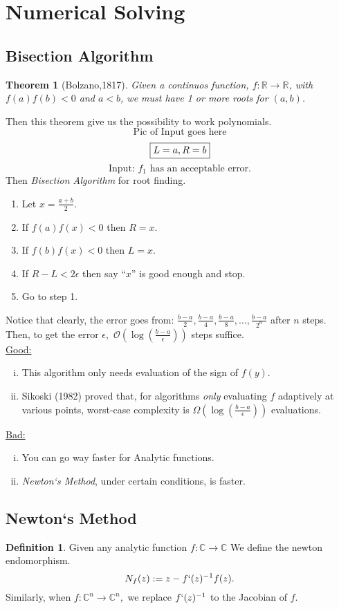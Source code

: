 \documentclass[]{article}
\newtheorem*{theorem}{Theorem}
\theoremstyle{definition}
\newtheorem*{defn}{Definition}
\newcommand{\lecture}[1]{\marginpar{{\footnotesize $\leftarrow$ \underline{#1}}}}
\begin{document}
			\section{Numerical Solving} \lecture{June 28, 2017}
			\subsection{Bisection Algorithm}
			\begin{theorem}[Bolzano,1817] Given a continuos function, $f:\mathbb{R}\to\mathbb{R}$, with $f(a)f(b)<0$ and $a<b$, we must have 1 or more roots for $(a,b)$.
			\end{theorem}
			Then this theorem give us the possibility to work polynomials.
						\[ \text{Pic of Input goes here} \]
						\[\framebox{$L=a, R=b$}\]
			\[\text{Input: $f_1$ has an acceptable error.}\]
			Then \emph{Bisection Algorithm} for root finding.
			\begin{enumerate}[(1)]
			\item Let $x=\frac{a+b}{2}.$
			\item If $f(a)f(x)<0$ then $R=x$.
			\item If $f(b)f(x)<0$ then $L=x$.
			\item If $R-L<2\epsilon$ then say ``$x$'' is good enough and stop.
			\item Go to step 1.
			\end{enumerate}
			Notice that clearly, the error goes from:
			$\frac{b-a}{2}, \frac{b-a}{4}, \frac{b-a}{8}, \ldots, \frac{b-a}{2^n}$
			after $n$ steps. Then, to get the error $\epsilon,$ $\mathcal{O}(\log(\frac{b-a}{\epsilon}))$ steps suffice.\\
			\underline{Good:}
			\begin{enumerate}[(i)]
			\item This algorithm only needs evaluation of the sign of $f(y)$.
			\item Sikoski (1982) proved that, for algorithms \emph{only} evaluating $f$ adaptively at various points, worst-case complexity is $				\Omega(\log(\frac{b-a}{\epsilon}))$ evaluations.
			\end{enumerate}
			\underline{Bad:}
			\begin{enumerate}[(i)]
			\item You can go way faster for Analytic functions.
			\item \emph{Newton`s Method}, under certain conditions, is faster.
			\end{enumerate}
			\subsection{Newton`s Method}
			\begin{defn}
			Given any analytic function $f: \mathbb{C} \to \mathbb{C}$ We define the newton endomorphism.
			\[N_f(z):= z-f`(z)^{-1}f(z).\]
			Similarly, when $f: \mathbb{C}^n \to \mathbb{C}^n,$ we replace $f`(z)^{-1}$ to the Jacobian of $f$.
			\end{defn}
\end{document}
